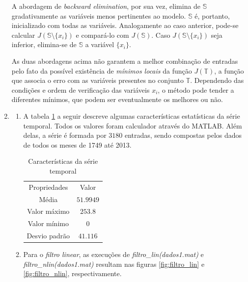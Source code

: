 \begin{enumerate}
			  A abordagem de  \textit{backward elimination}, por sua vez, elimina de \(\mathbb{S}\)
			  gradativamente as variáveis menos pertinentes ao modelo. \(\mathbb{S}\) é, portanto,
			  inicializado com todas as variáveis. Analogamente ao caso anterior, pode-se
			  calcular \(J\left(\mathbb{S} \setminus \{ x_i \} \right)\) e compará-lo com
			  \(J\left(\mathbb{S}\right)\). Caso \(J\left(\mathbb{S} \setminus \{ x_i \} \right)\) seja
			  inferior, elimina-se de \(\mathbb{S}\) a variável \(\{x_i\}\).
			  
			  As duas abordagens acima não garantem a melhor combinação de entradas pelo
			  fato da possível existência de \textit{mínimos locais} da função
			  \(J(\mathbb{T})\), a função que associa o erro com as variáveis presentes no
			  conjunto \(\mathbb{T}\). Dependendo das condições e ordem de verificação das
			  variáveis \(x_i\), o método pode tender a diferentes mínimos, que podem ser
			  eventualmente os melhores ou não.
			
			
			  \item \begin{enumerate}
			    \item A tabela \ref{tab:estat_tab} a seguir descreve algumas características estatísticas da série temporal. Todos os valores foram calculador através do MATLAB. Além delas, a série é formada por \(3180\) entradas, sendo compostas pelos dados de todos os meses de 1749 até 2013. 
			    
			    \begin{table}[h]
				    \centering
					\caption{\label{tab:estat_tab} Características da série temporal}
					\begin{tabular}{|c | c |}
						\hline
						Propriedades & Valor \\	\hhline{|=|=|}
						Média & \(51.9949\) \\ \hline 
						Valor máximo & \(253.8\) \\ \hline 
						Valor mínimo & \(0\) \\ \hline 			
						Desvio padrão & \(41.116\) \\ \hline 			
					\end{tabular}	    
			    \end{table}    
			    
			    \item Para o \textit{filtro linear}, as execuções de 
			    \textit{filtro\_lin(dados1.mat)} e \textit{filtro\_nlin(dados1.mat)}
			    resultam nas figuras \ref{fig:filtro_lin} e \ref{fig:filtro_nlin},
			    respectivamente.
			    

\end{enumerate}
\end{enumerate}
